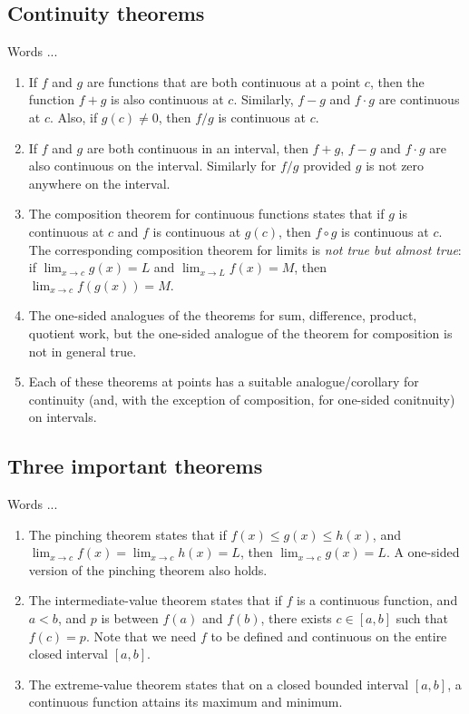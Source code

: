\documentclass[10pt]{amsart}
\begin{document}
\subsection*{Continuity theorems}

Words ...

\begin{enumerate}
\item If $f$ and $g$ are functions that are both continuous at a point
  $c$, then the function $f + g$ is also continuous at $c$. Similarly,
  $f - g$ and $f \cdot g$ are continuous at $c$. Also, if $g(c) \ne
  0$, then $f/g$ is continuous at $c$.
\item If $f$ and $g$ are both continuous in an interval, then $f + g$,
  $f - g$ and $f \cdot g$ are also continuous on the
  interval. Similarly for $f/g$ provided $g$ is not zero anywhere on
  the interval.
\item The composition theorem for continuous functions states that if
  $g$ is continuous at $c$ and $f$ is continuous at $g(c)$, then $f
  \circ g$ is continuous at $c$. The corresponding composition theorem
  for limits is {\em not true but almost true}: if $\lim_{x \to c}
  g(x) = L$ and $\lim_{x \to L} f(x) = M$, then $\lim_{x \to c}
  f(g(x)) = M$.
\item The one-sided analogues of the theorems for sum, difference,
  product, quotient work, but the one-sided analogue of the theorem
  for composition is not in general true.
\item Each of these theorems at points has a suitable
  analogue/corollary for continuity (and, with the exception of
  composition, for one-sided conitnuity) on intervals.
\end{enumerate}

\subsection*{Three important theorems}

Words ...

\begin{enumerate}
\item The pinching theorem states that if $f(x) \le g(x) \le h(x)$,
  and $\lim_{x \to c} f(x) = \lim_{x \to c} h(x) = L$, then $\lim_{x
  \to c} g(x) = L$. A one-sided version of the pinching theorem also
  holds.
\item The intermediate-value theorem states that if $f$ is a
  continuous function, and $a < b$, and $p$ is between $f(a)$ and
  $f(b)$, there exists $c \in [a,b]$ such that $f(c) = p$. Note that
  we need $f$ to be defined and continuous on the entire closed
  interval $[a,b]$.
\item The extreme-value theorem states that on a closed bounded
  interval $[a,b]$, a continuous function attains its maximum and
  minimum.
\end{enumerate}
\end{document}
